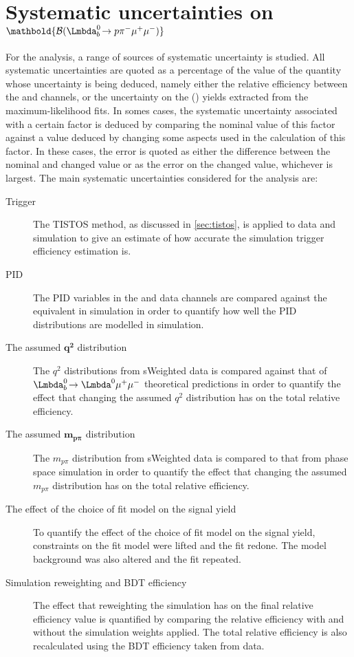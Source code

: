 \section[Systematic uncertainties on $\BF(\Lbpi)$]{Systematic uncertainties on $\mathbold{\BF(\Lbpi)}$}
\label{Sec:Systematics}
For the \Lbpi analysis, a range of sources of systematic uncertainty is studied.  All systematic uncertainties are quoted as a percentage of the value of the quantity whose uncertainty is being deduced, namely either the relative efficiency between the \Lbpi and \Lbpijpsi channels, or the uncertainty on the \Lbpi (\Lbpijpsi) yields extracted from the maximum-likelihood fits. In somes cases, the systematic uncertainty associated with a certain factor is deduced by comparing the nominal value of this factor against a value deduced by changing some aspects used in the calculation of this factor. In these cases, the error is quoted as either the difference between the nominal and changed value or as the error on the changed value, whichever is largest. The main systematic uncertainties considered for the \Lbpi analysis are:

\begin{description}
\item[Trigger] The TISTOS method, as discussed in \autoref{sec:tistos}, is applied to data and simulation to give an estimate of how accurate the simulation trigger efficiency estimation is.
\item[PID] The PID variables in the \LbKjpsi and \Lbpijpsi data channels are compared against the equivalent in simulation in order to quantify how well the PID distributions are modelled in simulation. %
\item[The assumed $\mathbold{q^{2}}$ distribution] The $q^{2}$ distributions from \LbK sWeighted data is compared against that of $\LbL$ theoretical predictions in order to quantify the effect that changing the assumed $q^{2}$ distribution has on the total relative efficiency.
  \item[The assumed $\mathbold{m_{p\pi}}$ distribution] The $m_{p\pi}$ distribution from \Lbpijpsi sWeighted data is compared to that from phase space \Lbpi simulation in order to quantify the effect that changing the assumed $m_{p\pi}$ distribution has on the total relative efficiency. 
\item[The effect of the choice of fit model on the signal yield] To quantify the effect of the choice of fit model on the signal yield, constraints on the \Lbpi fit model were lifted and the fit redone. The model background was also altered and the fit repeated. %
  \item[Simulation reweighting and BDT efficiency] The effect that reweighting the simulation has on the final relative efficiency value is quantified by comparing the relative efficiency with and without the simulation weights applied. The total relative efficiency is also recalculated using the BDT efficiency taken from \LbK data. 
  \end{description}
